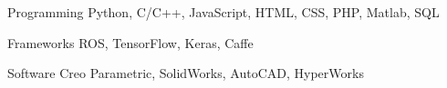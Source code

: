 


\begin{cvskills}


\cvskill
{Programming} %
{Python, C/C++, JavaScript, HTML, CSS, PHP, Matlab, SQL} %


\cvskill
{Frameworks} %
{ROS, TensorFlow, Keras, Caffe} %


\cvskill
{Software} %
{Creo Parametric, SolidWorks, AutoCAD, HyperWorks} %


\end{cvskills}